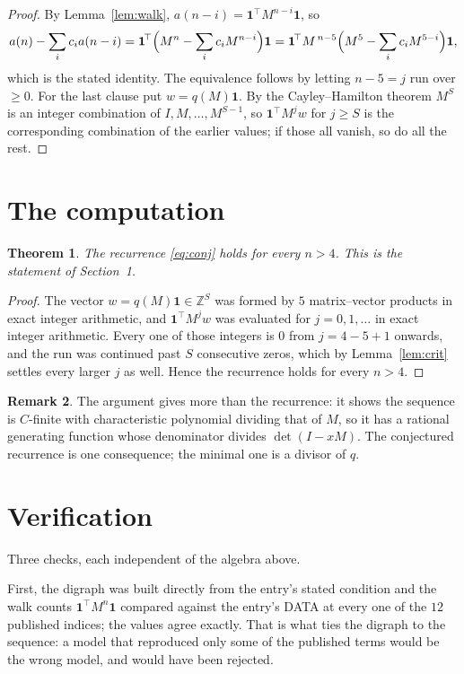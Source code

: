 \documentclass[11pt,a4paper]{article}
\theoremstyle{plain}
\newtheorem{theorem}{Theorem}
\theoremstyle{definition}
\newtheorem{remark}[theorem]{Remark}
\begin{document}
\begin{proof}
By Lemma~\ref{lem:walk}, $a(n-i)=\mathbf{1}^{\!\top}M^{n-i}\mathbf{1}$, so
\[
a(n)-\sum_i c_i a(n-i)
=\mathbf{1}^{\!\top}\Bigl(M^{n}-\sum_i c_i M^{n-i}\Bigr)\mathbf{1}
=\mathbf{1}^{\!\top}M^{\,n-5}\Bigl(M^{5}-\sum_i c_i M^{5-i}\Bigr)\mathbf{1},
\]
which is the stated identity. The equivalence follows by letting $n-5=j$ run over
$\ge0$. For the last clause put $w=q(M)\mathbf{1}$. By the Cayley--Hamilton theorem
$M^{S}$ is an integer combination of $I,M,\dots,M^{S-1}$, so
$\mathbf{1}^{\!\top}M^{j}w$ for $j\ge S$ is the corresponding combination of the
earlier values; if those all vanish, so do all the rest.
\end{proof}

\section{The computation}

\begin{theorem}
The recurrence \eqref{eq:conj} holds for every $n>4$. This is the statement of
Section~1.
\end{theorem}

\begin{proof}
The vector $w=q(M)\mathbf{1}\in\mathbb{Z}^{S}$ was formed by $5$ matrix--vector
products in exact integer arithmetic, and $\mathbf{1}^{\!\top}M^{j}w$ was evaluated for
$j=0,1,\dots$ in exact integer arithmetic. Every one of those integers is $0$ from
$j=4-5+1$ onwards, and the run was continued past $S$ consecutive zeros, which by
Lemma~\ref{lem:crit} settles every larger $j$ as well. Hence the recurrence holds for
every $n>4$.
\end{proof}

\begin{remark}
The argument gives more than the recurrence: it shows the sequence is $C$-finite with
characteristic polynomial dividing that of $M$, so it has a rational generating function
whose denominator divides $\det(I-xM)$. The conjectured recurrence is one consequence; the
minimal one is a divisor of $q$.
\end{remark}

\section{Verification}

Three checks, each independent of the algebra above.

First, the digraph was built directly from the entry's stated condition and the walk counts
$\mathbf{1}^{\!\top}M^{n}\mathbf{1}$ compared against the entry's DATA at every one of
the $12$ published indices; the values agree exactly. That is what ties the digraph to
the sequence: a model that reproduced only some of the published terms would be the wrong
model, and would have been rejected.
\end{document}
